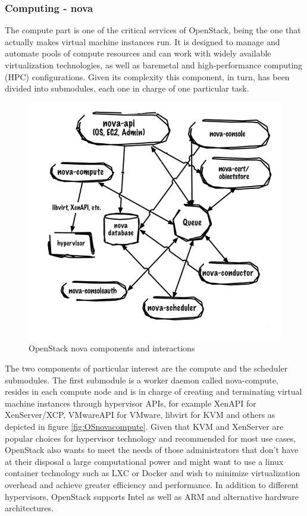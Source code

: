 \subsubsection{Computing - nova}
The compute part is one of the critical services of OpenStack, being the one that actually makes virtual machine instances run.
It is designed to manage and automate pools of compute resources and can work with widely available virtualization technologies, as well as baremetal and high-performance computing (HPC) configurations.
Given its complexity this component, in turn, has been divided into submodules, each one in charge of one particular task.
\begin{figure}[h]
	\centering
	\includegraphics[clip= true, width= \columnwidth]{images/nova_components.png}
	\caption{OpenStack nova components and interactions}
	\label{fig:OSnovalogical}
\end{figure}
The two components of particular interest are the compute and the scheduler submodules.
The first submodule is a worker daemon called nova-compute, resides in each compute node and is in charge of creating and terminating virtual machine instances through hypervisor APIs, for example XenAPI for XenServer/XCP, VMwareAPI for VMware, libvirt for KVM and others as depicted in figure \ref{fig:OSnovacompute}.
Given that KVM and XenServer are popular choices for hypervisor technology and recommended for most use cases, OpenStack also wants to meet the needs of those administrators that don't have at their disposal a large computational power and might want to use a linux container technology such as LXC or Docker and wish to minimize virtualization overhead and achieve greater efficiency and performance. In addition to different hypervisors, OpenStack supports Intel as well as ARM and alternative hardware architectures.
